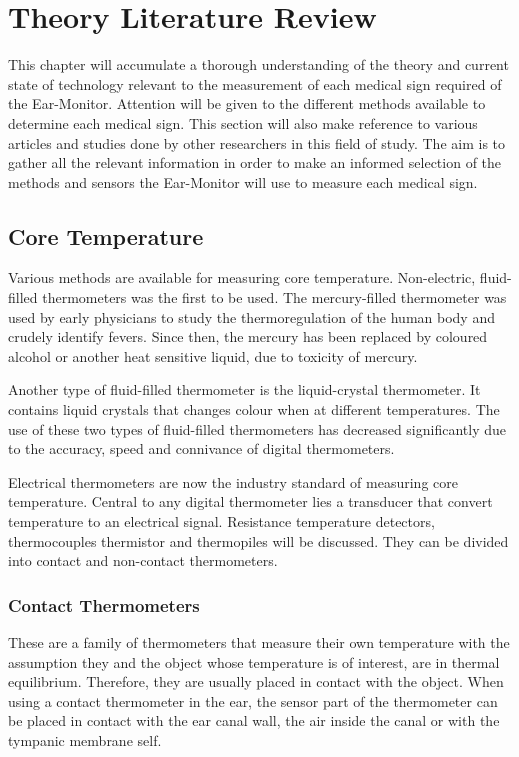 \chapter{Theory Literature Review}
\label{chp:Theory Literature Review}
This chapter will accumulate a thorough understanding of the theory and current state of technology relevant to the measurement of each medical sign required of the Ear-Monitor. Attention will be given to the different methods available to determine each medical sign. This section will also make reference to various articles and studies done by other researchers in this field of study. The aim is to gather all the relevant information in order to make an informed selection of the methods and sensors the Ear-Monitor will use to measure each medical sign.

\section{Core Temperature}
Various methods are available for measuring core temperature. Non-electric, fluid-filled thermometers was the first to be used. The mercury-filled thermometer was used by early physicians to study the thermoregulation of the human body and crudely identify fevers. Since then, the mercury has been replaced by coloured alcohol or another heat sensitive liquid, due to toxicity of mercury.

\medskip

Another type of fluid-filled thermometer is the liquid-crystal thermometer. It contains liquid crystals that changes colour when at different temperatures. The use of these two types of fluid-filled thermometers has decreased significantly due to the accuracy, speed and connivance of digital thermometers.

\medskip

Electrical thermometers are now the industry standard of measuring core temperature. Central to any digital thermometer lies a transducer that convert temperature to an electrical signal. Resistance temperature detectors, thermocouples thermistor and thermopiles will be discussed. They can be divided into contact and non-contact thermometers.

\subsection{Contact Thermometers}
These are a family of thermometers that measure their own temperature with the assumption they and the object whose temperature is of interest, are in thermal equilibrium. Therefore, they are usually placed in contact with the object. When using a contact thermometer in the ear, the sensor part of the thermometer can be placed in contact with the ear canal wall, the air inside the canal or with the tympanic membrane self.

